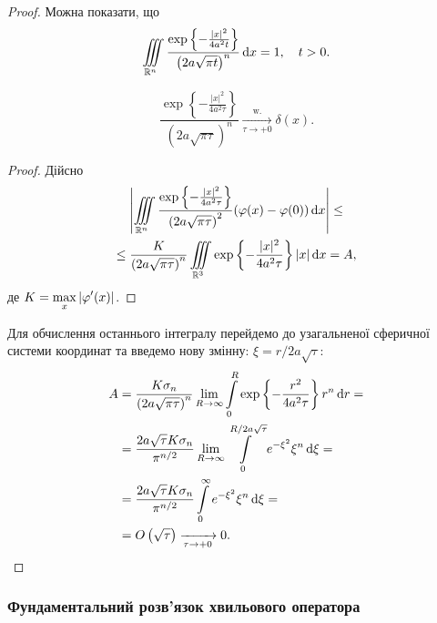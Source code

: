 \begin{proof}
	Можна показати, що
	\begin{equation}
		\displaystyle\iiint\limits_{\mathbb{R}^n} \frac{\exp\left\{-\frac{|x|^2}{4a^2t}\right\}}{\left(2a\sqrt{\pi t}\right)^n} \mathop{}\!\mathrm{d} x = 1, \quad t > 0.
	\end{equation}

	\begin{proposition}
		\begin{equation}
			\frac{\exp\left\{-\frac{|x|^2}{4a^2\tau}\right\}}{\left(2a\sqrt{\pi\tau}\right)^n} \xrightarrow[\tau \to + 0]{\text{w.}}\delta(x).
		\end{equation}
	\end{proposition}

	\begin{proof}
		Дійсно
		\begin{multline}
			\left| \displaystyle\iiint\limits_{\mathbb{R}^n} \frac{\exp\left\{-\frac{|x|^2}{4a^2\tau}\right\}}{\left(2a\sqrt{\pi\tau}\right)^2} (\varphi(x) - \varphi(0)) \mathop{}\!\mathrm{d} x \right| \le \\
			\le \frac{K}{\left(2a\sqrt{\pi\tau}\right)^n} \displaystyle\iiint\limits_{\mathbb{R}^3} \exp\left\{-\frac{|x|^2}{4a^2\tau}\right\} |x| \mathop{}\!\mathrm{d} x = A,
		\end{multline}
		де $K = \displaystyle\max\limits_x |\varphi'(x)|$.
	\end{proof}

	Для обчислення останнього інтегралу перейдемо до узагальненої сферичної системи координат та введемо нову змінну: $\xi = r / 2 a \sqrt{\tau}$:
	\begin{equation}
		\begin{aligned}
			A &= \frac{K \sigma_n}{\left(2a\sqrt{\pi\tau}\right)^n} \displaystyle\lim\limits_{R \to \infty} \displaystyle\int\limits_0^R \exp\left\{-\frac{r^2}{4a^2\tau}\right\}r^n \mathop{}\!\mathrm{d} r = \\
			&= \frac{2a\sqrt{\tau}K\sigma_n}{\pi^{n/2}} \displaystyle\lim\limits_{R \to \infty} \displaystyle\int\limits_0^{R / 2 a \sqrt{\tau}} e^{-\xi^2} \xi^n \mathop{}\!\mathrm{d} \xi = \\
			&= \frac{2a\sqrt{\tau}K\sigma_n}{\pi^{n/2}} \displaystyle\int\limits_0^\infty e^{-\xi^2} \xi^n \mathop{}\!\mathrm{d} \xi = \\
			&= O\left(\sqrt{\tau}\right) \xrightarrow[\tau\to+0]{}0.
		\end{aligned}
	\end{equation}
\end{proof}
 
\subsubsection{Фундаментальний розв'язок хвильового оператора}


